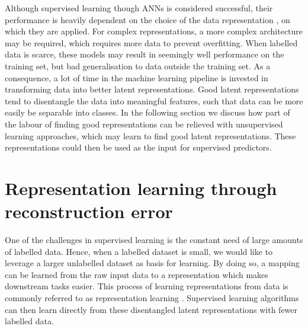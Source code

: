 

Although supervised learning though ANNs is considered successful, their performance is heavily dependent on the choice of the data representation \cite{bengioRepresentationLearningReview2013}, on which they are applied. For complex representations, a more complex architecture may be required, which requires more data to prevent overfitting. When labelled data is scarce, these models may result in seemingly well performance on the training set, but bad generalisation to data outside the training set. As a consequence, a lot of time in the machine learning pipeline is invested in transforming data into better latent representations. Good latent representations tend to disentangle the data into meaningful features, such that data can be more easily be separable into classes. In the following section we discuss how part of the labour of finding good representations can be relieved with unsupervised learning approaches, which may learn to find good latent representations. These representations could then be used as the input for supervised predictors.




\section{Representation learning through reconstruction error}
One of the challenges in supervised learning is the constant need of large amounts of labelled data. Hence, when a labelled dataset is small, we would like to leverage a larger unlabelled dataset as basis for learning. By doing so, a mapping can be learned from the raw input data to a representation which makes downstream tasks easier. This process of learning representations from data is commonly referred to as representation learning \cite{le-khacContrastiveRepresentationLearning2020}. Supervised learning algorithms can then learn directly from these disentangled latent representations with fewer labelled data.

